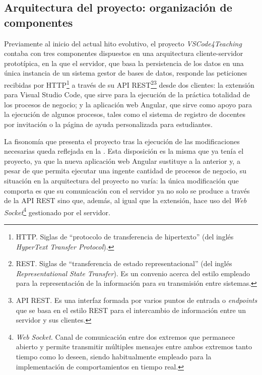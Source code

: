 \subsection{Arquitectura del proyecto: organización de componentes}
\label{subsec:arq}

Previamente al inicio del actual hito evolutivo, el proyecto \textit{VSCode4Teaching} contaba con tres componentes dispuestos en una arquitectura cliente-servidor prototípica, en la que el servidor, que basa la persistencia de los datos en una única instancia de un sistema gestor de bases de datos, responde las peticiones recibidas por HTTP\footnote{HTTP. Siglas de ``protocolo de transferencia de hipertexto'' (del inglés \textit{HyperText Transfer Protocol}).} a través de su API REST\footnote{REST. Siglas de ``transferencia de estado representacional'' (del inglés \textit{Representational State Transfer}). Es un convenio acerca del estilo empleado para la representación de la información para su transmisión entre sistemas.}\footnote{API REST. Es una interfaz formada por varios puntos de entrada o \textit{endpoints} que se basa en el estilo REST para el intercambio de información entre un servidor y sus clientes.} desde dos clientes: la extensión para Visual Studio Code, que sirve para la ejecución de la práctica totalidad de los procesos de negocio; y la aplicación web Angular, que sirve como apoyo para la ejecución de algunos procesos, tales como el sistema de registro de docentes por invitación o la página de ayuda personalizada para estudiantes.

La fisonomía que presenta el proyecto tras la ejecución de las modificaciones necesarias queda reflejada en la . Esta disposición es la misma que ya tenía el proyecto, ya que la nueva aplicación web Angular sustituye a la anterior y, a pesar de que permita ejecutar una ingente cantidad de procesos de negocio, su situación en la arquitectura del proyecto no varía: la única modificación que comporta es que su comunicación con el servidor ya no solo se produce a través de la API REST sino que, además, al igual que la extensión, hace uso del \textit{Web Socket}\footnote{\textit{Web Socket}. Canal de comunicación entre dos extremos que permanece abierto y permite transmitir múltiples mensajes entre ambos extremos tanto tiempo como lo deseen, siendo habitualmente empleado para la implementación de comportamientos en tiempo real.} gestionado por el servidor.



